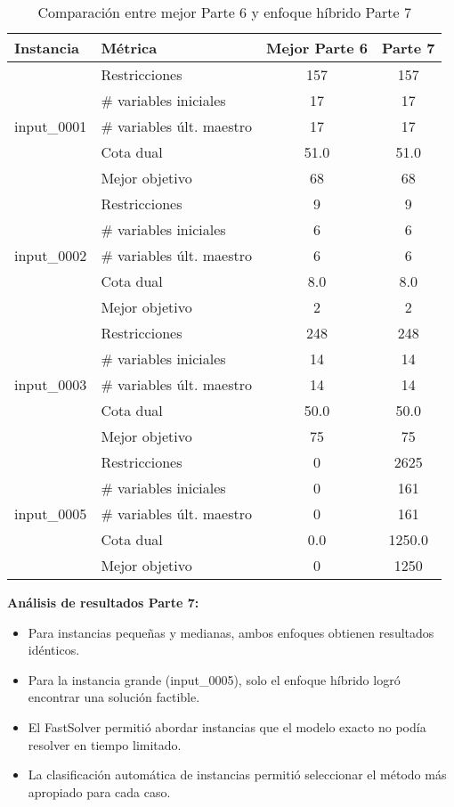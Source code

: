 \documentclass[a4paper,12pt]{article}
\begin{document}
\begin{table}[!ht]
\centering
\renewcommand{\arraystretch}{1.2}
\begin{tabular}{llcc}
\toprule
\textbf{Instancia} & \textbf{Métrica} & \textbf{Mejor Parte 6} & \textbf{Parte 7} \\
\midrule
\multirow{5}{*}{input\_0001} 
  & Restricciones               & 157   & 157   \\
  & \# variables iniciales      & 17    & 17    \\
  & \# variables últ. maestro   & 17    & 17    \\
  & Cota dual                   & 51.0  & 51.0  \\
  & Mejor objetivo              & 68    & 68    \\
\midrule
\multirow{5}{*}{input\_0002} 
  & Restricciones               & 9     & 9     \\
  & \# variables iniciales      & 6     & 6     \\
  & \# variables últ. maestro   & 6     & 6     \\
  & Cota dual                   & 8.0   & 8.0   \\
  & Mejor objetivo              & 2     & 2     \\
\midrule
\multirow{5}{*}{input\_0003} 
  & Restricciones               & 248   & 248   \\
  & \# variables iniciales      & 14    & 14    \\
  & \# variables últ. maestro   & 14    & 14    \\
  & Cota dual                   & 50.0  & 50.0  \\
  & Mejor objetivo              & 75    & 75    \\
\midrule
\multirow{5}{*}{input\_0005} 
  & Restricciones               & 0     & 2625  \\
  & \# variables iniciales      & 0     & 161   \\
  & \# variables últ. maestro   & 0     & 161   \\
  & Cota dual                   & 0.0   & 1250.0\\
  & Mejor objetivo              & 0     & 1250  \\
\bottomrule
\end{tabular}
\caption{Comparación entre mejor Parte 6 y enfoque híbrido Parte 7}
\end{table}

\textbf{Análisis de resultados Parte 7:}
\begin{itemize}
    \item Para instancias pequeñas y medianas, ambos enfoques obtienen resultados idénticos.
    \item Para la instancia grande (input\_0005), solo el enfoque híbrido logró encontrar una solución factible.
    \item El FastSolver permitió abordar instancias que el modelo exacto no podía resolver en tiempo limitado.
    \item La clasificación automática de instancias permitió seleccionar el método más apropiado para cada caso.
\end{itemize}
\end{document}
